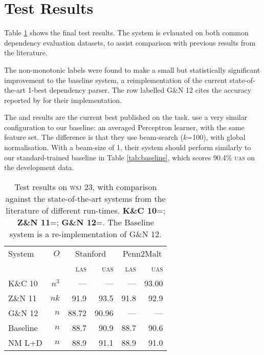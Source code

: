 \documentclass[11pt,letterpaper]{article}
\newcommand{\las}{\textsc{las}\xspace}
\newcommand{\uas}{\textsc{uas}\xspace}
\newcommand{\wsj}{\textsc{wsj}\xspace}
\begin{document}



\section{Test Results}

Table \ref{tab:eval} shows the final test results. The system is evlauated on
both common dependency evaluation datasets, to assist comparison with previous
results from the literature.

The non-monotonic labels were found to make a small but statistically significant
improvement to the baseline system, a reimplementation of the current state-of-the-art
1-best dependency parser. The row labelled G\&N 12 cites the accuracy reported by
\citet{goldberg:12} for their implementation.

The \citet{koo:10} and \citet{zhang:11} results are the current best published
on the task. \citet{zhang:11} use a very similar configuration to our baseline:
an averaged Perceptron learner, with the same feature set. The difference is 
that they use beam-search ($k$=100), with global normalisation. With a beam-size
of 1, their system should perform similarly to our standard-trained baseline in
Table \ref{tab:baseline}, which scores 90.4\% \uas on the development data.

\begin{table}
    \centering
    \small
    \begin{tabular}{l|r|rr|rr}
        \hline 
System  &   $O$ &  \multicolumn{2}{c}{Stanford} & \multicolumn{2}{|c}{Penn2Malt} \\
        &       &  \las  & \uas  & \las & \uas \\
        \hline \hline
K\&C 10  & $n^3$ & ---   & ---   & ---  & 93.00 \\
Z\&N 11  & $nk$  & 91.9  & 93.5  & 91.8 & 92.9 \\
G\&N 12  & $n$   & 88.72 & 90.96 & ---  & --- \\
        \hline
Baseline    & $n$ & 88.7 & 90.9 & 88.7  & 90.6 \\
NM L+D      & $n$ & 88.9 & 91.1 & 88.9  & 91.0 \\
\hline
    \end{tabular}
    \caption{\small Test results on \wsj 23, with comparison against the
        state-of-the-art systems from the literature of different run-times.
        \textbf{K\&C 10}=\citet{koo:10}; \textbf{Z\&N 11}=\citet{zhang:11};
        \textbf{G\&N 12}=\citet{goldberg:12}. The Baseline system is a re-implementation
             of G\&N 12.\label{tab:eval}}
\end{table}
\end{document}
